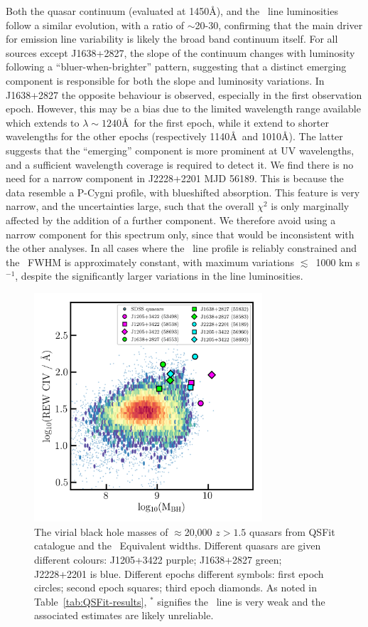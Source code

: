 \documentclass[fleqn,usenatbib]{mnras}
\begin{document}
Both the quasar continuum (evaluated at 1450\AA), and the \civ\ line
luminosities follow a similar evolution, with a ratio of $\sim$20-30,
confirming that the main driver for emission line variability is
likely the broad band continuum itself.  For all sources except
J1638+2827, the slope of the continuum changes with luminosity
following a ``bluer-when-brighter'' pattern, suggesting that a
distinct emerging component is responsible for both the slope and
luminosity variations.  In J1638+2827 the opposite behaviour is
observed, especially in the first observation epoch.  However, this
may be a bias due to the limited wavelength range available which
extends to $\lambda \sim 1240$\AA\ for the first epoch, while it extend
to shorter wavelengths for the other epochs (respectively 1140\AA\ and
1010\AA).  The latter suggests that the ``emerging'' component is more
prominent at UV wavelengths, and a sufficient wavelength coverage is
required to detect it. We find there is no need for a narrow component
in J2228+2201 MJD 56189.  This is because the data resemble a P-Cygni
profile, with blueshifted absorption. This feature is very narrow, and
the uncertainties large, such that the overall $\chi^{2}$ is only
marginally affected by the addition of a further component. We
therefore avoid using a narrow component for this spectrum only, since
that would be inconsistent with the other analyses.
In all cases where the \civ\ line profile is reliably constrained and the
\civ\ FWHM is approximately constant, with maximum variations
$\lesssim$~1000 km s$^{-1}$, despite the significantly larger
variations in the line luminosities.


\begin{figure}
  \centering
  \includegraphics[width=8.5cm, trim=0.2cm 0.2cm 0.0cm 0.2cm, clip]
  {figures/CIV_CLQs_MBHvsREW_QSFit20K.png}
   \vspace{-12pt}
   \caption[]{The virial black hole masses of $\approx$20,000 $z>1.5$ quasars
     from QSFit catalogue \citep{Calderone2017} and the \civ\
     Equivalent widths.  Different quasars are given different colours:
     J1205+3422 purple; J1638+2827 green; J2228+2201 is blue.  Different
     epochs different symbols: first epoch circles; second epoch squares;
     third epoch diamonds.  As noted in Table~\ref{tab:QSFit-results},
     $^{*}$ signifies the \civ\ line is very weak and the associated
     estimates are likely unreliable.}
   \label{fig:CIV_MBHvsREW}
\end{figure}
\end{document}

